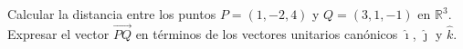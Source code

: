 Calcular la distancia entre los puntos $P = (1, -2, 4)$ y $Q = (3, 1, -1)$ en $\mathbb{R}^3$. Expresar el vector $\overrightarrow{PQ}$ en términos de los vectores unitarios canónicos $\hat{\imath}$, $\hat{\jmath}$ y $\hat{k}$.
